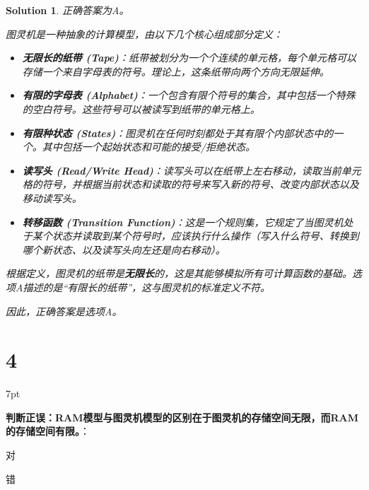 \documentclass[UTF8]{report}
\newtheorem{solution}{Solution}
\theoremstyle{MyLineTheoremStyle} %
\theoremstyle{MyBlockTheoremStyle} %
\theoremstyle{MySubsubsectionStyle} %
\newenvironment{graybox}{%
        \def\FrameCommand{%
        \hspace{1pt}%
        {\color{gray}\small \vrule width 2pt}%
        {\color{graybox_color}\vrule width 4pt}%
        \colorbox{graybox_color}%
        }%
        \MakeFramed{\advance\hsize-\width\FrameRestore}%
        \noindent\hspace{-4.55pt}%
        \begin{adjustwidth}{}{7pt}%
        \vspace{2pt}\vspace{2pt}%
        }
        {%
        \vspace{2pt}\end{adjustwidth}\endMakeFramed%
        }
\begin{document}
\begin{solution}
正确答案为A。

图灵机是一种抽象的计算模型，由以下几个核心组成部分定义：
\begin{itemize}
    \item \textbf{无限长的纸带 (Tape)}：纸带被划分为一个个连续的单元格，每个单元格可以存储一个来自字母表的符号。理论上，这条纸带向两个方向无限延伸。
    \item \textbf{有限的字母表 (Alphabet)}：一个包含有限个符号的集合，其中包括一个特殊的空白符号。这些符号可以被读写到纸带的单元格上。
    \item \textbf{有限种状态 (States)}：图灵机在任何时刻都处于其有限个内部状态中的一个。其中包括一个起始状态和可能的接受/拒绝状态。
    \item \textbf{读写头 (Read/Write Head)}：读写头可以在纸带上左右移动，读取当前单元格的符号，并根据当前状态和读取的符号来写入新的符号、改变内部状态以及移动读写头。
    \item \textbf{转移函数 (Transition Function)}：这是一个规则集，它规定了当图灵机处于某个状态并读取到某个符号时，应该执行什么操作（写入什么符号、转换到哪个新状态、以及读写头向左还是向右移动）。
\end{itemize}
根据定义，图灵机的纸带是\textbf{无限长}的，这是其能够模拟所有可计算函数的基础。选项A描述的是“有限长的纸带”，这与图灵机的标准定义不符。

因此，正确答案是选项A。
\end{solution}

\section*{4}

\begin{graybox}
\textbf{判断正误：RAM模型与图灵机模型的区别在于图灵机的存储空间无限，而RAM的存储空间有限。}：
\begin{circledenum}
    \item 对
    \item 错
\end{circledenum}
\end{graybox}
\end{document}
